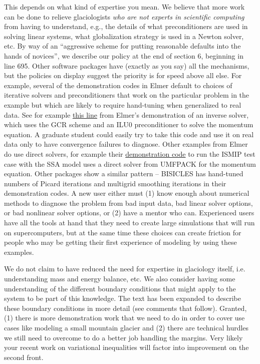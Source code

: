 \documentclass{article}
\theoremstyle{definition}
\theoremstyle{plain}
\begin{document}
This depends on what kind of expertise you mean.
We believe that more work can be done to relieve glaciologists \emph{who are not experts in scientific computing} from having to understand, e.g., the details of what preconditioners are used in solving linear systems, what globalization strategy is used in a Newton solver, etc.
By way of an ``aggressive scheme for putting reasonable defaults into the hands of novices'', we describe our policy at the end of section 6, beginning in line 695.
Other software packages have (exactly as you say) all the mechanisms, but the policies on display suggest the priority is for speed above all else.
For example, several of the demonstration codes in Elmer default to choices of iterative solvers and preconditioners that work on the particular problem in the example but which are likely to require hand-tuning when generalized to real data.
See for example \href{https://github.com/ElmerCSC/elmerfem/blob/aaa6c4a345c73ba248c475d27975c5e3a9fa7758/elmerice/examples/Inverse_Methods/MacAyeal_Stokes/SIF/OPTIM_CONT.sif#L161}{this line} from Elmer's demonstration of an inverse solver, which uses the GCR scheme and an ILU0 preconditioner to solve the momentum equation.
A graduate student could easily try to take this code and use it on real data only to have convergence failures to diagnose.
Other examples from Elmer do use direct solvers, for example their \href{https://github.com/ElmerCSC/elmerfem/blob/aaa6c4a345c73ba248c475d27975c5e3a9fa7758/elmerice/examples/Test_SSA/ismip_SSA_2D.sif#L105}{demonstration code} to run the ISMIP test case with the SSA model uses a direct solver from UMFPACK for the momentum equation.
Other packages show a similar pattern -- BISICLES has hand-tuned numbers of Picard iterations and multigrid smoothing iterations in their demonstration codes.
A new user either must (1) know enough about numerical methods to diagnose the problem from bad input data, bad linear solver options, or bad nonlinear solver options, or (2) have a mentor who can.
Experienced users have all the tools at hand that they need to create large simulations that will run on supercomputers, but at the same time these choices can create friction for people who may be getting their first experience of modeling by using these examples.

We do not claim to have reduced the need for expertise in glaciology itself, i.e. understanding mass and energy balance, etc.
We also consider having some understanding of the different boundary conditions that might apply to the system to be part of this knowledge.
The text has been expanded to describe these boundary conditions in more detail (see comments that follow).
Granted, (1) there is more demonstration work that we need to do in order to cover use cases like modeling a small mountain glacier and (2) there are technical hurdles we still need to overcome to do a better job handling the margins.
Very likely your recent work on variational inequalities will factor into improvement on the second front.
\end{document}
